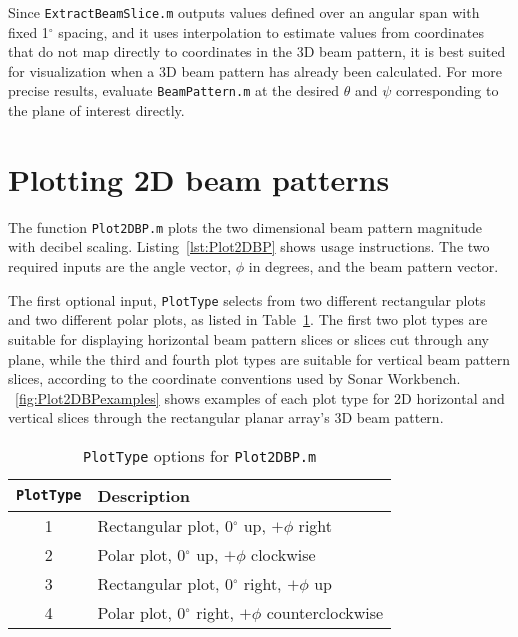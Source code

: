 

Since \texttt{ExtractBeamSlice.m} outputs values defined over an angular span with fixed 1$^\circ$ spacing, and it uses interpolation to estimate values from coordinates that do not map directly to coordinates in the 3D beam pattern, it is best suited for visualization when a 3D beam pattern has already been calculated. For more precise results, evaluate \texttt{BeamPattern.m} at the desired $\theta$ and $\psi$ corresponding to the plane of interest directly. 

\section{Plotting 2D beam patterns}

The function \texttt{Plot2DBP.m} plots the two dimensional beam pattern magnitude with decibel scaling. Listing~\ref{lst:Plot2DBP} shows usage instructions. The two required inputs are the angle vector, $\phi$ in degrees, and the beam pattern vector.

The first optional input, \texttt{PlotType} selects from two different rectangular plots and two different polar plots, as listed in Table~\ref{tab:Plot2DBPlotType}. The first two plot types are suitable for displaying horizontal beam pattern slices or slices cut through any plane, while the third and fourth plot types are suitable for vertical beam pattern slices, according to the coordinate conventions used by Sonar Workbench. \figurename~\ref{fig:Plot2DBPexamples} shows examples of each plot type for 2D horizontal and vertical slices through the rectangular planar array's 3D beam pattern.

\begin{table}[!ht]
	\begin{center}
		\caption{\texttt{PlotType} options for \texttt{Plot2DBP.m}}
		\label{tab:Plot2DBPlotType}
		\begin{tabular}{c|l} 
			\texttt{PlotType} & \textbf{Description} \\
			\hline
			1 & Rectangular plot, 0$^\circ$ up, $+\phi$ right \\
			2 & Polar plot, 0$^\circ$ up, $+\phi$ clockwise \\
			3 & Rectangular plot, 0$^\circ$ right, $+\phi$ up \\
			4 & Polar plot, 0$^\circ$ right, $+\phi$ counterclockwise \\
		\end{tabular}
	\end{center}
\end{table}

